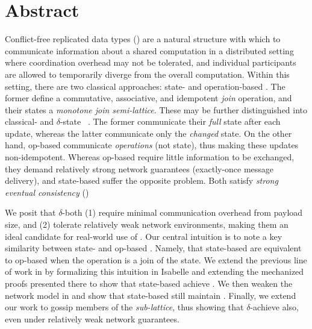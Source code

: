 \chapter*{Abstract}

Conflict-free replicated data types (\CRDTs) are a natural structure with which
to communicate information about a shared computation in a distributed setting
where coordination overhead may not be tolerated, and individual participants
are allowed to temporarily diverge from the overall computation.  Within this
setting, there are two classical approaches: state- and operation-based \CRDTs.
The former define a commutative, associative, and idempotent \textit{join}
operation, and their states a \textit{monotone join semi-lattice}. These may be
further distinguished into classical- and $\delta$-state
\CRDTs~\citep{almedia18}. The former communicate their \emph{full} state after
each update, whereas the latter communicate only the \emph{changed} state. On
the other hand, op-based \CRDTs communicate \emph{operations} (not state), thus
making these updates non-idempotent.  Whereas op-based \CRDTs require little
information to be exchanged, they demand relatively strong network guarantees
(exactly-once message delivery), and state-based \CRDTs suffer the opposite
problem. Both satisfy \textit{strong eventual consistency} (\SEC)

We posit that $\delta$-\CRDTs both (1) require minimal communication overhead
from payload size, and (2) tolerate relatively weak network environments, making
them an ideal candidate for real-world use of \CRDTs. Our central intuition is
to note a key similarity between state- and op-based \CRDTs. Namely, that
state-based \CRDTs are equivalent to op-based \CRDTs when the operation is a
join of the state. We extend the previous line of work in \cite{gomes17} by
formalizing this intuition in Isabelle and extending the mechanized proofs
presented there to show that state-based \CRDTs achieve \SEC. We then weaken the
network model in \cite{gomes17} and show that state-based \CRDTs still maintain
\SEC. Finally, we extend our work to gossip members of the \textit{sub-lattice},
thus showing that $\delta$-\CRDTs achieve \SEC also, even under relatively weak
network guarantees.
